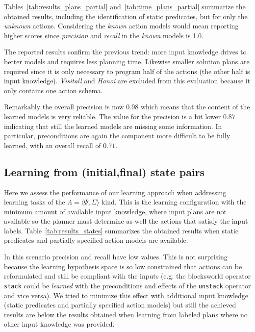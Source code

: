 \documentclass[letterpaper]{article} %
\newcommand{\tup}[1]{{\langle #1 \rangle}}
\begin{document}
Tables~\ref{tab:results_plans_partial} and~\ref{tab:time_plans_partial} summarize the obtained results, including the identification of static predicates, but for only the {\em unknown} actions. Considering the {\em known} action models would mean reporting higher scores since {\em precision} and {\em recall} in the {\em known} models is 1.0.

The reported results confirm the previous trend: more input knowledge drives to better models and requires less planning time. Likewise smaller solution plans are required since it is only necessary to program half of the actions (the other half is input knowledge). {\em Visitall} and {\em Hanoi} are excluded from this evaluation because it only contains one action schema.

Remarkably the overall precision is now $0.98$ which means that the content of the learned models is very reliable. The value for the precision is a bit lower $0.87$ indicating that still the learned models are missing some information. In particular, preconditions are again the component more difficult to be fully learned, with an overall recall of $0.71$.

\subsection{Learning from (initial,final) state pairs}
Here we assess the performance of our learning approach when addressing learning tasks of the  $\Lambda=\tup{\Psi,\Sigma}$ kind. This is the learning configuration with the minimum amount of available input knowledge, where input plans are not available so the planner must determine as well the actions that satisfy the input labels. Table~\ref{tab:results_states} summarizes the obtained results when static predicates and partially specified action models are available. 

In this scenario precision and recall have low values. This is not surprising because the learning hypothesis space is so low constrained that actions can be reformulated and still be compliant with the inputs (e.g. the blocksworld operator {\small\tt stack} could be {\em learned} with the preconditions and effects of the {\small\tt unstack} operator and vice versa). We tried to minimize this effect with additional input knowledge (static predicates and partially specified action models) but still the achieved results are below the results obtained when learning from labeled plans where no other input knowledge was provided. 
\end{document}

